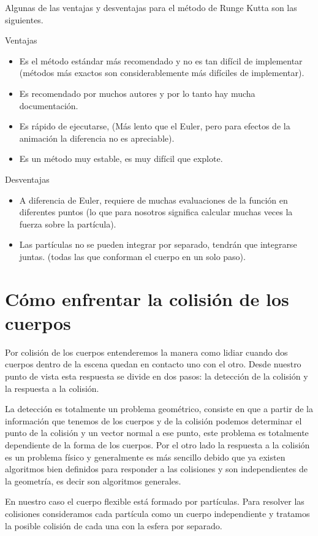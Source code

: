 Algunas de las ventajas y desventajas para el método de Runge Kutta son las siguientes.

Ventajas
\begin{itemize}
\item Es el método estándar más recomendado y no es tan difícil de implementar (métodos más exactos son considerablemente más difíciles de implementar).
\item Es recomendado por muchos autores y por lo tanto hay mucha documentación.
\item Es rápido de ejecutarse, (Más lento que el Euler, pero para efectos de la animación la diferencia no es apreciable).
\item Es un método muy estable, es muy difícil que explote.
\end{itemize}

Desventajas
\begin{itemize}
\item A diferencia de Euler, requiere de muchas evaluaciones de la función en diferentes puntos (lo que para nosotros significa calcular muchas veces la fuerza sobre la partícula).
\item Las partículas no se pueden integrar por separado, tendrán que integrarse juntas. (todas las que conforman el cuerpo en un solo paso).
\end{itemize}

\section{Cómo enfrentar la colisión de los cuerpos}
Por colisión de los cuerpos entenderemos la manera como lidiar cuando dos cuerpos dentro de la escena quedan en contacto uno con el otro.
Desde nuestro punto de vista esta respuesta se divide en dos pasos: la detección de la colisión y la respuesta a la colisión.

La detección es totalmente un problema geométrico, consiste en que a partir de la información que tenemos de los cuerpos y de la colisión podemos determinar el punto de la colisión y un vector normal a ese punto, este problema es totalmente dependiente de la forma de los cuerpos.
Por el otro lado la respuesta a la colisión es un problema físico y generalmente es más sencillo debido que ya existen algoritmos bien definidos para responder a las colisiones y son independientes de la geometría, es decir son algoritmos generales.

En nuestro caso el cuerpo flexible está formado por partículas.
Para resolver las colisiones consideramos cada partícula como un cuerpo independiente y tratamos la posible colisión de cada una con la esfera por separado.

